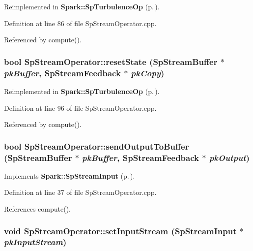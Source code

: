 Reimplemented in {\bf Spark::Sp\-Turbulence\-Op} {\rm (p.\,\pageref{classSpark_1_1SpTurbulenceOp_b2})}.

Definition at line 86 of file Sp\-Stream\-Operator.cpp.

Referenced by compute().
\subsubsection{\setlength{\rightskip}{0pt plus 5cm}bool Sp\-Stream\-Operator::reset\-State ({\bf Sp\-Stream\-Buffer} $\ast$ {\em pk\-Buffer}, {\bf Sp\-Stream\-Feedback} $\ast$ {\em pk\-Copy})\hspace{0.3cm}{\tt  [protected, virtual]}}\label{classSpark_1_1SpStreamOperator_b5}




Reimplemented in {\bf Spark::Sp\-Turbulence\-Op} {\rm (p.\,\pageref{classSpark_1_1SpTurbulenceOp_b4})}.

Definition at line 96 of file Sp\-Stream\-Operator.cpp.

Referenced by compute().
\subsubsection{\setlength{\rightskip}{0pt plus 5cm}bool Sp\-Stream\-Operator::send\-Output\-To\-Buffer ({\bf Sp\-Stream\-Buffer} $\ast$ {\em pk\-Buffer}, {\bf Sp\-Stream\-Feedback} $\ast$ {\em pk\-Output})\hspace{0.3cm}{\tt  [virtual]}}\label{classSpark_1_1SpStreamOperator_a4}




Implements {\bf Spark::Sp\-Stream\-Input} {\rm (p.\,\pageref{classSpark_1_1SpStreamInput_a3})}.

Definition at line 37 of file Sp\-Stream\-Operator.cpp.

References compute().
\subsubsection{\setlength{\rightskip}{0pt plus 5cm}void Sp\-Stream\-Operator::set\-Input\-Stream ({\bf Sp\-Stream\-Input} $\ast$ {\em pk\-Input\-Stream})\hspace{0.3cm}{\tt  [virtual]}}\label{classSpark_1_1SpStreamOperator_a2}


